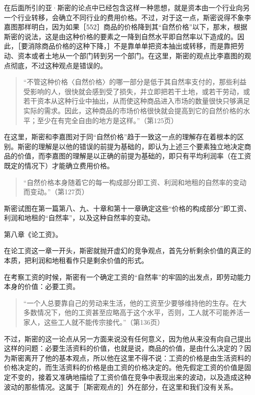 在后面所引的亚·斯密的论点中已经包含这样一种思想，就是资本由一个行业向另一个行业转移，会确立不同行业的费用价格。不过，对于这一点，斯密说得不象李嘉图那样明白，因为如果［552］商品的价格降到其“自然价格”以下，那末，根据斯密的说法，这是由这种价格的要素之一降到自然水平即自然率以下造成的。因此，［要消除商品价格的这种下降，］不是靠单单把资本抽出或转移，而是靠把劳动、资本或者土地从一个部门转到另一个部门。在这里，斯密的观点比李嘉图的观点彻底，不过这种观点是错误的。

\begin{quote}{“不管这种价格〈自然价格〉的哪一部分是低于其自然率支付的，那些利益受影响的人，很快就会感到受了损失，并立即把若干土地，或若干劳动，或若干资本从这种行业中抽出，从而使这种商品进入市场的数量很快只够满足实际的需求。因此，这种商品的市场价格很快就会提高到它的自然价格的水平；至少在有完全自由的地方是这样。”（第125页）}\end{quote}

在这里，斯密和李嘉图对于同“自然价格”趋于一致这一点的理解存在着根本的区别。斯密的理解是以他的错误的前提为基础的，即认为上述三个要素独立地决定商品的价值，而李嘉图的理解是以正确的前提为基础的，即只有平均利润率（在工资既定的情况下）才能确立费用价格。


\begin{quote}{“自然价格本身随着它的每一构成部分即工资、利润和地租的自然率的变动而变动。”（第127页）}\end{quote}

斯密试图在第一篇第八、九、十章和第十一章确定这些“价格的构成部分”即工资、利润和地租的“自然率”，以及这种自然率的变动。

第八章《论工资》。

在论工资这一章一开头，斯密就抛开虚幻的竞争观点，首先分析剩余价值的真正的本质，把利润和地租看作只是剩余价值的形式。

在考察工资的时候，斯密有一个确定工资的“自然率”的牢固的出发点，即劳动能力本身的价值：必要工资。

\begin{quote}{“一个人总要靠自己的劳动来生活，他的工资至少要够维持他的生存。在大多数情况下，他的工资甚至应略高于这个水平，否则，工人就不可能养活一家人，这些工人就不能传宗接代。”（第136页）}\end{quote}

不过，斯密的这一论点从另一方面来说没有任何意义，因为他从来没有向自己提出这样的问题：必要生活资料的价值，也就是说，商品的价值，是由什么决定的？因为斯密离开了他的基本观点，所以他在这里不得不说：工资的价格是由生活资料的价格决定的，而生活资料的价格是由工资的价格决定的。他先假定工资的价值是固定不变的，接着又准确地描绘了工资价值在竞争中表现出来的波动，以及造成这种波动的那些情况。这属于［斯密观点的］外在部分，在这里和我们没有关系。

